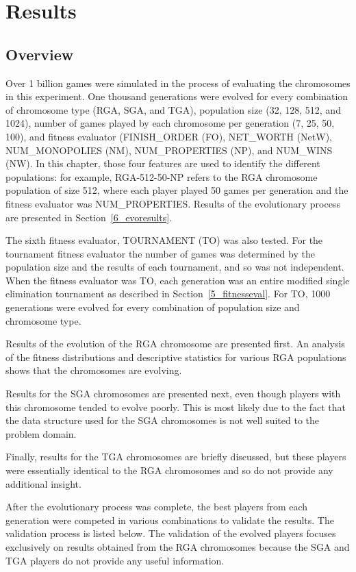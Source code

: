 \clearpage
\chapter{Results}\label{chap:results}

\section{Overview}

Over 1 billion games were simulated in the process of evaluating the chromosomes
in this experiment. One thousand generations were evolved for every combination
of chromosome type (RGA, SGA, and TGA), population size (32, 128, 512, and
1024), number of games played by each chromosome per generation (7, 25, 50,
100), and fitness evaluator (FINISH\_ORDER (FO), NET\_WORTH (NetW),
NUM\_MONOPOLIES (NM), NUM\_PROPERTIES (NP), and NUM\_WINS (NW). In this chapter,
those four features are used to identify the different populations: for example,
RGA-512-50-NP refers to the RGA chromosome population of size 512, where each
player played 50 games per generation and the fitness evaluator was
NUM\_PROPERTIES. Results of the evolutionary process are presented in
Section~\ref{6_evoresults}.

The sixth fitness evaluator, TOURNAMENT (TO) was also tested. For the tournament
fitness evaluator the number of games was determined by the population size and
the results of each tournament, and so was not independent. When the fitness
evaluator was TO, each generation was an entire modified single elimination
tournament as described in Section~\ref{5_fitnesseval}. For TO, 1000 generations
were evolved for every combination of population size and chromosome type.

Results of the evolution of the RGA chromosome are presented first. An analysis
of the fitness distributions and descriptive statistics for various RGA
populations shows that the chromosomes are evolving.

Results for the SGA chromosomes are presented next, even though players with
this chromosome tended to evolve poorly. This is most likely due to the fact
that the data structure used for the SGA chromosomes is not well suited to the
problem domain.

Finally, results for the TGA chromosomes are briefly discussed, but these
players were essentially identical to the RGA chromosomes and so do not provide
any additional insight.

After the evolutionary process was complete, the best players from each
generation were competed in various combinations to validate the results. The
validation process is listed below. The validation of the evolved players
focuses exclusively on results obtained from the RGA chromosomes because the
SGA and TGA players do not provide any useful information.

